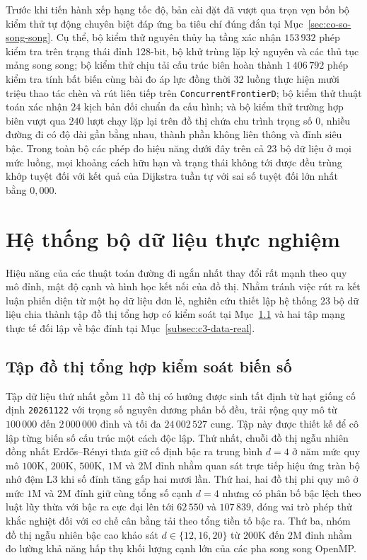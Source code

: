 Trước khi tiến hành xếp hạng tốc độ, bản cài đặt đã vượt qua trọn vẹn bốn bộ kiểm thử tự động chuyên biệt đáp ứng ba tiêu chí đúng đắn tại Mục~\ref{sec:co-so-song-song}. Cụ thể, bộ kiểm thử nguyên thủy hạ tầng xác nhận $153\,932$ phép kiểm tra trên trạng thái đỉnh 128-bit, bộ khử trùng lặp kỷ nguyên và các thủ tục mảng song song; bộ kiểm thử chịu tải cấu trúc biên hoàn thành $1\,406\,792$ phép kiểm tra tính bất biến cùng bài đo áp lực đồng thời $32$ luồng thực hiện mười triệu thao tác chèn và rút liên tiếp trên \texttt{Concurrent\allowbreak FrontierD}; bộ kiểm thử thuật toán xác nhận $24$ kịch bản đối chuẩn đa cấu hình; và bộ kiểm thử trường hợp biên vượt qua $240$ lượt chạy lặp lại trên đồ thị chứa chu trình trọng số $0$, nhiều đường đi có độ dài gần bằng nhau, thành phần không liên thông và đỉnh siêu bậc. Trong toàn bộ các phép đo hiệu năng dưới đây trên cả $23$ bộ dữ liệu ở mọi mức luồng, mọi khoảng cách hữu hạn và trạng thái không tới được đều trùng khớp tuyệt đối với kết quả của Dijkstra tuần tự với sai số tuyệt đối lớn nhất bằng $0{,}000$.

\section{Hệ thống bộ dữ liệu thực nghiệm}\label{sec:c3-du-lieu}

Hiệu năng của các thuật toán đường đi ngắn nhất thay đổi rất mạnh theo quy mô đỉnh, mật độ cạnh và hình học kết nối của đồ thị. Nhằm tránh việc rút ra kết luận phiến diện từ một họ dữ liệu đơn lẻ, nghiên cứu thiết lập hệ thống $23$ bộ dữ liệu chia thành tập đồ thị tổng hợp có kiểm soát tại Mục~\ref{subsec:c3-data-syn} và hai tập mạng thực tế đối lập về bậc đỉnh tại Mục~\ref{subsec:c3-data-real}.

\subsection{Tập đồ thị tổng hợp kiểm soát biến số}\label{subsec:c3-data-syn}

Tập dữ liệu thứ nhất gồm $11$ đồ thị có hướng được sinh tất định từ hạt giống cố định \texttt{20261122} với trọng số nguyên dương phân bố đều, trải rộng quy mô từ $100\,000$ đến $2\,000\,000$ đỉnh và tối đa $24\,002\,527$ cung. Tập này được thiết kế để cô lập từng biến số cấu trúc một cách độc lập. Thứ nhất, chuỗi đồ thị ngẫu nhiên đồng nhất Erd\H{o}s--R\'{e}nyi thưa giữ cố định bậc ra trung bình $d = 4$ ở năm mức quy mô $100\mathrm{K}$, $200\mathrm{K}$, $500\mathrm{K}$, $1\mathrm{M}$ và $2\mathrm{M}$ đỉnh nhằm quan sát trực tiếp hiệu ứng tràn bộ nhớ đệm L3 khi số đỉnh tăng gấp hai mươi lần. Thứ hai, hai đồ thị phi quy mô ở mức $1\mathrm{M}$ và $2\mathrm{M}$ đỉnh giữ cùng tổng số cạnh $d = 4$ nhưng có phân bố bậc lệch theo luật lũy thừa với bậc ra cực đại lên tới $62\,550$ và $107\,839$, đóng vai trò phép thử khắc nghiệt đối với cơ chế cân bằng tải theo tổng tiền tố bậc ra. Thứ ba, nhóm đồ thị ngẫu nhiên bậc cao khảo sát $d \in \{12, 16, 20\}$ từ $200\mathrm{K}$ đến $2\mathrm{M}$ đỉnh nhằm đo lường khả năng hấp thụ khối lượng cạnh lớn của các pha song song OpenMP.

